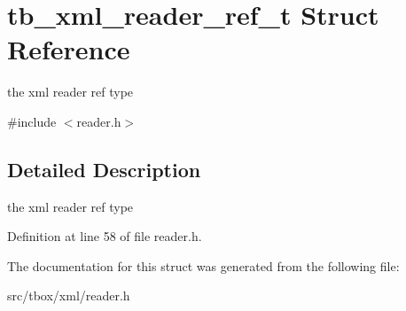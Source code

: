 \hypertarget{structtb__xml__reader__ref__t}{\section{tb\-\_\-xml\-\_\-reader\-\_\-ref\-\_\-t Struct Reference}
\label{structtb__xml__reader__ref__t}
}


the xml reader ref type  




{\ttfamily \#include $<$reader.\-h$>$}



\subsection{Detailed Description}
the xml reader ref type 

Definition at line 58 of file reader.\-h.



The documentation for this struct was generated from the following file\-:\begin{DoxyCompactItemize}
\item 
src/tbox/xml/reader.\-h\end{DoxyCompactItemize}

